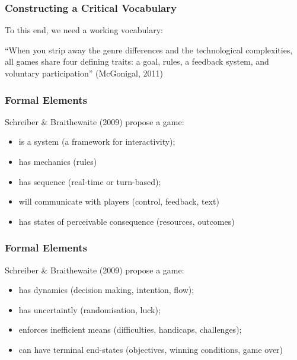 \begin{frame}
	\frametitle{Constructing a Critical Vocabulary}
	
	To this end, we need a working vocabulary:
	
	\vspace{3em}
	
	``When you strip away the genre differences and the technological complexities, all games share four defining traits: a goal, rules, a feedback system, and voluntary participation'' (McGonigal, 2011)

\end{frame}

\begin{frame}
	\frametitle{Formal Elements}
	
	Schreiber \& Braithewaite (2009) propose a game:
	
	\begin{itemize}
		\item is a system (a framework for interactivity);
		\item has mechanics (rules)
		\item has sequence (real-time or turn-based);
		\item will communicate with players (control, feedback, text)
		\item has states of perceivable consequence (resources, outcomes)
	\end{itemize}

\end{frame}

\begin{frame}
	\frametitle{Formal Elements}
	
	Schreiber \& Braithewaite (2009) propose a game:
	
	\begin{itemize}
		\item has dynamics (decision making, intention, flow);
		\item has uncertaintly (randomisation, luck);
		\item enforces inefficient means (difficulties, handicaps, challenges);
		\item can have terminal end-states (objectives, winning conditions, game over)
	\end{itemize}

\end{frame}

